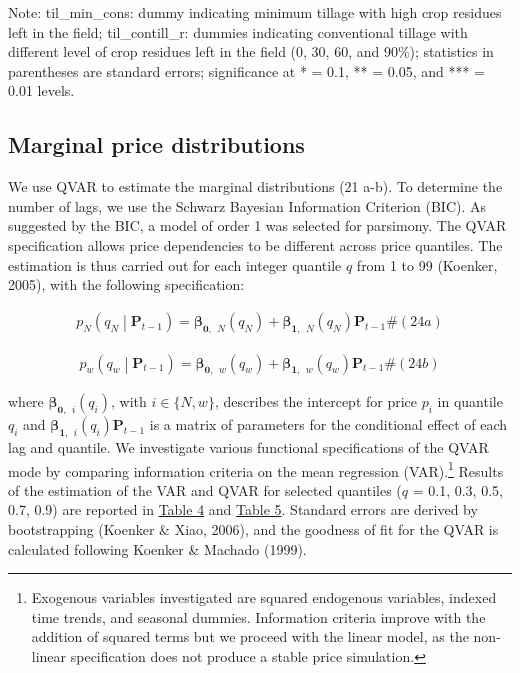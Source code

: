 \documentclass[
]{article}
\begin{document}
Note: til\_min\_cons: dummy indicating minimum tillage with high crop
residues left in the field; til\_contill\_r: dummies indicating
conventional tillage with different level of crop residues left in the
field (0, 30, 60, and 90\%); statistics in parentheses are standard
errors; significance at * = 0.1, ** = 0.05, and *** = 0.01 levels.

\subsection{Marginal price
distributions}\label{marginal-price-distributions}

We use QVAR to estimate the marginal distributions (21 a-b). To
determine the number of lags, we use the Schwarz Bayesian Information
Criterion (BIC). As suggested by the BIC, a model of order 1 was
selected for parsimony. The QVAR specification allows price dependencies
to be different across price quantiles. The estimation is thus carried
out for each integer quantile \(q\) from 1 to 99 (Koenker, 2005), with
the following specification:

\[\begin{array}{r}
p_{N}\left( q_{N} \middle| \mathbf{P}_{t - 1} \right) = \mathbf{\beta}_{\mathbf{0,\ \ }N}\left( q_{N} \right) + \mathbf{\beta}_{\mathbf{1,\ \ }N}\left( q_{N} \right)\mathbf{P}_{t - 1}\#(24a)
\end{array}\]

\[\begin{array}{r}
p_{w}\left( q_{w} \middle| \mathbf{P}_{t - 1} \right) = \mathbf{\beta}_{\mathbf{0,\ \ }w}\left( q_{w} \right) + \mathbf{\beta}_{\mathbf{1,\ \ }w}\left( q_{w} \right)\mathbf{P}_{t - 1}\#(24b)
\end{array}\]

where \(\mathbf{\beta}_{\mathbf{0,\ \ }i}(q_{i})\), with
\(i \in \{ N,w\}\), describes the intercept for price \(p_{i}\) in
quantile \(q_{i}\) and
\(\mathbf{\beta}_{\mathbf{1,\ \ }i}(q_{i})\mathbf{P}_{t - 1}\) is a
matrix of parameters for the conditional effect of each lag and
quantile. We investigate various functional specifications of the QVAR
mode by comparing information criteria on the mean regression
(VAR).\footnote{Exogenous variables investigated are squared endogenous
  variables, indexed time trends, and seasonal dummies. Information
  criteria improve with the addition of squared terms but we proceed
  with the linear model, as the non-linear specification does not
  produce a stable price simulation.} Results of the estimation of the
VAR and QVAR for selected quantiles (\(q\) = 0.1, 0.3, 0.5, 0.7, 0.9)
are reported in \hyperref[_Ref214526676]{Table 4} and
\hyperref[_Ref214526730]{Table 5}. Standard errors are derived by
bootstrapping (Koenker \& Xiao, 2006), and the goodness of fit for the
QVAR is calculated following Koenker \& Machado (1999).
\end{document}
